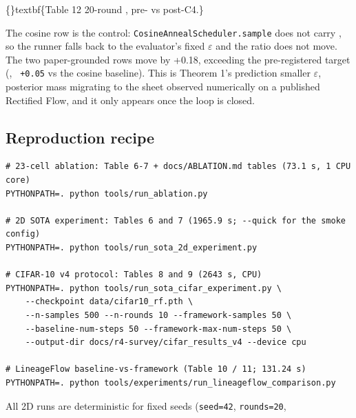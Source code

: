 \documentclass{article}
\begin{document}
\{\}textbf\{Table 12  20-round , pre- vs post-C4.\}

\begin{table}[ht]
\centering
\small
{}%
\end{table}

The cosine row is the control: \texttt{CosineAnnealScheduler.sample} does not carry , so the runner falls back to the evaluator's fixed $\varepsilon$ and the ratio does not move. The two paper-grounded rows move by +0.18, exceeding the pre-registered target (, \texttt{  +0.05} vs the cosine baseline). This is Theorem 1's prediction  smaller $\varepsilon$, posterior mass migrating to the sheet  observed numerically on a published Rectified Flow, and it only appears once the loop is closed.

\subsection{Reproduction recipe}
\begin{verbatim}
# 23-cell ablation: Table 6-7 + docs/ABLATION.md tables (73.1 s, 1 CPU core)
PYTHONPATH=. python tools/run_ablation.py

# 2D SOTA experiment: Tables 6 and 7 (1965.9 s; --quick for the smoke config)
PYTHONPATH=. python tools/run_sota_2d_experiment.py

# CIFAR-10 v4 protocol: Tables 8 and 9 (2643 s, CPU)
PYTHONPATH=. python tools/run_sota_cifar_experiment.py \
    --checkpoint data/cifar10_rf.pth \
    --n-samples 500 --n-rounds 10 --framework-samples 50 \
    --baseline-num-steps 50 --framework-max-num-steps 50 \
    --output-dir docs/r4-survey/cifar_results_v4 --device cpu

# LineageFlow baseline-vs-framework (Table 10 / 11; 131.24 s)
PYTHONPATH=. python tools/experiments/run_lineageflow_comparison.py
\end{verbatim}
All 2D runs are deterministic for fixed seeds (\texttt{seed=42}, \texttt{rounds=20},
\end{document}
